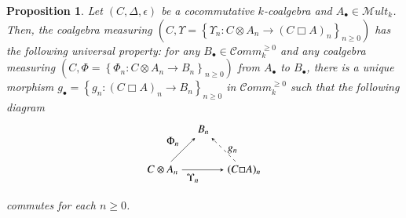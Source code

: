 \documentclass[10pt, colorlinks]{article}
\numberwithin{equation}{section} \DeclareMathSizes{2}{10}{12}{13}
\newtheorem{thm}{Proposition}[section]
\begin{document}
 
    \begin{thm}\label{prop3.6}
        Let $(C,\Delta,\epsilon)$ be a cocommutative $k$-coalgebra and $A_\bullet\in \mathscr Mult_k$. Then, the coalgebra measuring $(C,\Upsilon=\left\{\Upsilon_n: C\otimes A_n\longrightarrow (C\Box A)_n\right\}_{n\geq 0})$  has the following universal property: for any $B_\bullet\in \mathcal Comm_k^{\geq 0}$ and any coalgebra measuring $(C,\Phi=\left\{\Phi_n: C\otimes A_n\longrightarrow B_n\right\}_{n\geq 0})$ from $A_\bullet$ to $B_\bullet$, there is a unique morphism $g_\bullet=\left\{g_n:(C\Box A)_n \longrightarrow B_n\right\}_{n\geq 0}$ in $\mathcal Comm_k^{\geq 0}$ such that the following diagram 
      \begin{equation}\label{dig319c}
      \begin{array}{c}
      \begin{tikzpicture}[>=stealth]
         \node (A) at (0,0) {$C\otimes A_n$};
         \node (B) at (1.3,1.3) {$B_n$};
         \node (C) at (2.6,0) {$(C \Box A)_n$};
         \draw[->] (A) -- node[above left] {$\Phi_n$} (B);
         \draw[->] (A) -- node[below left] {$\qquad\Upsilon_n$} (C);
         \draw[->, dashed] (C) -- node[right] {$g_n$} (B);
      \end{tikzpicture}
      \end{array}
     \end{equation}
     commutes for each $n\geq 0$. 
    \end{thm}
\end{document}
